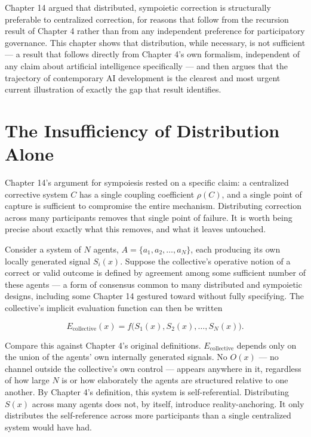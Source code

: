 \documentclass[12pt,a4paper]{book}
\begin{document}
Chapter 14 argued that distributed, sympoietic correction is structurally preferable to centralized correction, for reasons that follow from the recursion result of Chapter 4 rather than from any independent preference for participatory governance. This chapter shows that distribution, while necessary, is not sufficient — a result that follows directly from Chapter 4's own formalism, independent of any claim about artificial intelligence specifically — and then argues that the trajectory of contemporary AI development is the clearest and most urgent current illustration of exactly the gap that result identifies.

\section{The Insufficiency of Distribution Alone}

Chapter 14's argument for sympoiesis rested on a specific claim: a centralized corrective system $C$ has a single coupling coefficient $\rho(C)$, and a single point of capture is sufficient to compromise the entire mechanism. Distributing correction across many participants removes that single point of failure. It is worth being precise about exactly what this removes, and what it leaves untouched.

Consider a system of $N$ agents, $A = \{a_1, a_2, \ldots, a_N\}$, each producing its own locally generated signal $S_i(x)$. Suppose the collective's operative notion of a correct or valid outcome is defined by agreement among some sufficient number of these agents — a form of consensus common to many distributed and sympoietic designs, including some Chapter 14 gestured toward without fully specifying. The collective's implicit evaluation function can then be written

\[E_{\mathrm{collective}}(x) = f\bigl(S_1(x), S_2(x), \ldots, S_N(x)\bigr).\]

Compare this against Chapter 4's original definitions. $E_{\mathrm{collective}}$ depends only on the union of the agents' own internally generated signals. No $O(x)$ — no channel outside the collective's own control — appears anywhere in it, regardless of how large $N$ is or how elaborately the agents are structured relative to one another. By Chapter 4's definition, this system is self-referential. Distributing $S(x)$ across many agents does not, by itself, introduce reality-anchoring. It only distributes the self-reference across more participants than a single centralized system would have had.
\end{document}
